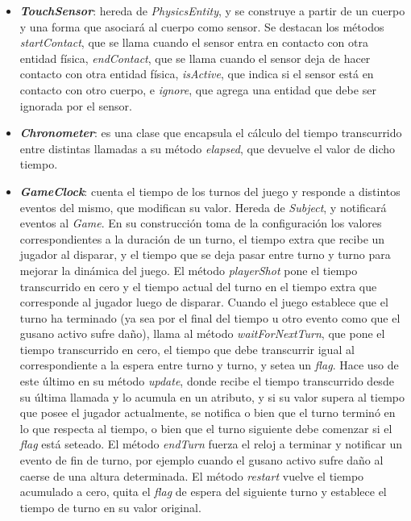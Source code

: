 \begin{itemize}
	\item \textbf{\textit{TouchSensor}}: hereda de \textit{PhysicsEntity}, y se construye a partir de un cuerpo y una forma que asociará al cuerpo como sensor. Se destacan los métodos \textit{startContact}, que se llama cuando el sensor entra en contacto con otra entidad física, \textit{endContact}, que se llama cuando el sensor deja de hacer contacto con otra entidad física, \textit{isActive}, que indica si el sensor está en contacto con otro cuerpo, e \textit{ignore}, que agrega una entidad que debe ser ignorada por el sensor.
	
	\item \textbf{\textit{Chronometer}}: es una clase que encapsula el cálculo del tiempo transcurrido entre distintas llamadas a su método \textit{elapsed}, que devuelve el valor de dicho tiempo.
	
	\item \textbf{\textit{GameClock}}: cuenta el tiempo de los turnos del juego y responde a distintos eventos del mismo, que modifican su valor. Hereda de \textit{Subject}, y notificará eventos al \textit{Game}. En su construcción toma de la configuración los valores correspondientes a la duración de un turno, el tiempo extra que recibe un jugador al disparar, y el tiempo que se deja pasar entre turno y turno para mejorar la dinámica del juego. El método \textit{playerShot} pone el tiempo transcurrido en cero y el tiempo actual del turno en el tiempo extra que corresponde al jugador luego de disparar. Cuando el juego establece que el turno ha terminado (ya sea por el final del tiempo u otro evento como que el gusano activo sufre daño), llama al método \textit{waitForNextTurn}, que pone el tiempo transcurrido en cero, el tiempo que debe transcurrir igual al correspondiente a la espera entre turno y turno, y setea un \textit{flag}. Hace uso de este último en su método \textit{update}, donde recibe el tiempo transcurrido desde su última llamada y lo acumula en un atributo, y si su valor supera al tiempo que posee el jugador actualmente, se notifica o bien que el turno terminó en lo que respecta al tiempo, o bien que el turno siguiente debe comenzar si el \textit{flag} está seteado. El método \textit{endTurn} fuerza el reloj a terminar y notificar un evento de fin de turno, por ejemplo cuando el gusano activo sufre daño al caerse de una altura determinada. El método \textit{restart} vuelve el tiempo acumulado a cero, quita el \textit{flag} de espera del siguiente turno y establece el tiempo de turno en su valor original.
	

\end{itemize}

